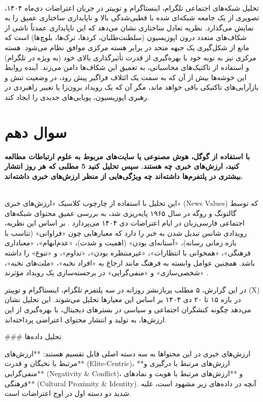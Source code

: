 \documentclass{article}
\begin{document}
\\
	تحلیل شبکه‌های اجتماعی تلگرام، اینستاگرام و توییتر در جریان اعتراضات دی‌ماه ۱۴۰۴، تصویری از یک جامعه شبکه‌ای شده با قطبی‌شدگی بالا و ناپایداری ساختاری عمیق را به نمایش می‌گذارد. نظریه تعادل ساختاری نشان می‌دهد که این ناپایداری عمدتاً ناشی از شکاف‌های متعدد درون اپوزیسیون (سلطنت‌طلبان، کردها، ترک‌ها، بلوچ‌ها) است که مانع از شکل‌گیری یک جبهه متحد در برابر هسته مرکزی موافق نظام می‌شود. هسته مرکزی نیز به نوبه خود با بهره‌گیری از قدرت تأثیرگذاری بالای خود (به ویژه در تلگرام) و استفاده از تاکتیک‌های محاسباتی، به تعمیق این شکاف‌ها دامن می‌زند. آینده روابط این خوشه‌ها بیش‌ از آن که به سمت یک ائتلاف فراگیر پیش رود، در وضعیت تنش و بازآرایی‌های تاکتیکی باقی خواهد ماند، مگر آن که یک رویداد برون‌زا یا تغییر راهبردی در رهبری اپوزیسیون، پویایی‌های جدیدی را ایجاد کند.
	



\section{سوال دهم}
\textbf{با استفاده از گوگل، هوش مصنوعی یا سایت‌های مربوط به علوم ارتباطات مطالعه کنید، ارزش‌های خبری چه هستند. سپس تحلیل کنید 5 مطلبی که هر روز انتشار بیشتری در پلتفرم‌ها داشته‌اند چه ویژگی‌هایی از منظر ارزش‌های خبری داشته‌اند.}

\\
این تحلیل با استفاده از چارچوب کلاسیک «ارزش‌های خبری» (News Values) که توسط گالتونگ و روگه در سال ۱۹۶۵ پایه‌ریزی شد، به بررسی عمیق محتوای شبکه‌های اجتماعی فارسی‌زبان در ایام اعتراضات دی ۱۴۰۴ می‌پردازد . بر اساس این نظریه، رویدادی شانس تبدیل شدن به خبر را دارد که معیارهایی چون «فراوانی» (تناسب با بازه زمانی رسانه)، «آستانه‌ای بودن» (اهمیت و شدت)، «عدم‌ابهام»، «معناداری فرهنگی»، «همخوانی با انتظارات»، «غیرمنتظره بودن»، «تداوم»، و «تنوع» را داشته باشد. همچنین عوامل وابسته به فرهنگ مانند ارجاع به «افراد نخبه»، «ملت‌های نخبه»، «شخصی‌سازی» و «منفی‌گرایی» در برجسته‌سازی یک رویداد مؤثرند .

در این گزارش، ۵ مطلب پربازنشر روزانه در سه پلتفرم تلگرام، اینستاگرام و توییتر (X) در بازه ۱۵ تا ۲۰ دی ۱۴۰۴ بر اساس این معیارها تحلیل می‌شوند. این تحلیل نشان می‌دهد چگونه کنشگران اجتماعی و سیاسی در بسترهای دیجیتال، با بهره‌گیری از این ارزش‌ها، به تولید و انتشار محتوای اعتراضی پرداخته‌اند.

### تحلیل داده‌ها

ارزش‌های خبری در این محتواها به سه دسته اصلی قابل تقسیم هستند: **ارزش‌های مرتبط با نخبگان و قدرت** (Elite-Centric)، **ارزش‌های مرتبط با درگیری و منفی‌گرایی** (Negativity & Conflict)، و **ارزش‌های مرتبط با هویت و نمادهای فرهنگی** (Cultural Proximity & Identity). آنچه در داده‌های زیر مشهود است، غلبه شدید دو دسته اول در اوج اعتراضات است.
\end{document}
